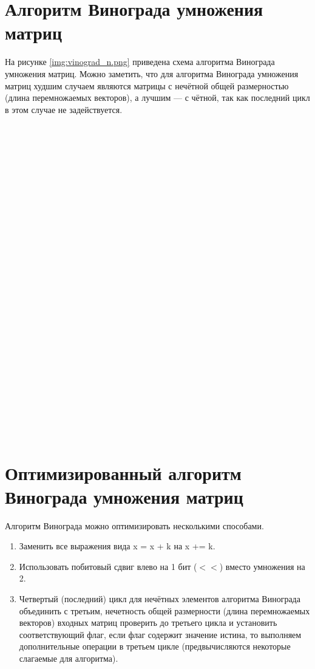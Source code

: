 \section{Алгоритм Винограда умножения матриц}
На рисунке \ref{img:vinograd_n.png} приведена схема алгоритма Винограда умножения матриц.
Можно заметить, что для алгоритма Винограда умножения матриц худшим случаем являются матрицы с нечётной общей размерностью (длина перемножаемых векторов), а лучшим --- с чётной, так как последний цикл в этом случае не задействуется.
\\
\\
\\
\\
\\
\\
\\
\\
\\
\\
\\
\\
\\
\\
\\
\\
\\
\\
\\
\\
\\
\\
\\
\\
\\
\\
\\
\\



\FloatBarrier
\section{Оптимизированный алгоритм Винограда умножения матриц}
Алгоритм Винограда можно оптимизировать несколькими способами.
\begin{enumerate}[label={\arabic*)}]
	\item Заменить все выражения вида x = x + k на x += k.
	\item Использовать побитовый сдвиг влево на 1 бит ($<<$) вместо умножения на 2.
	\item Четвертый (последний) цикл для нечётных элементов алгоритма Винограда объединить с третьим, нечетность общей размерности (длина перемножаемых векторов) входных матриц проверить до третьего цикла и установить соответствующий флаг, если флаг содержит значение истина, то выполняем дополнительные операции в третьем цикле (предвычисляются некоторые слагаемые для алгоритма).
\end{enumerate}

